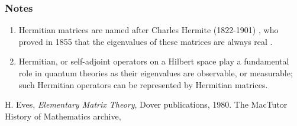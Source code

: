 \documentclass[12pt]{article}
\begin{document}
\subsubsection*{Notes}
\begin{enumerate}
\item Hermitian matrices are named after Charles Hermite (1822-1901) \cite{hermite}, who proved  in 1855 that the 
eigenvalues of these matrices are always real \cite{eves}.
\item Hermitian, or self-adjoint operators on a Hilbert space play a fundamental
role in quantum theories as their eigenvalues are observable, or measurable; such
Hermitian operators can be represented by Hermitian matrices.
\end{enumerate}

\begin{thebibliography}{9}
  H. Eves,
 \emph{Elementary Matrix Theory},
 Dover publications, 1980.
 The MacTutor History of Mathematics archive, 
\end{thebibliography}
\end{document}
